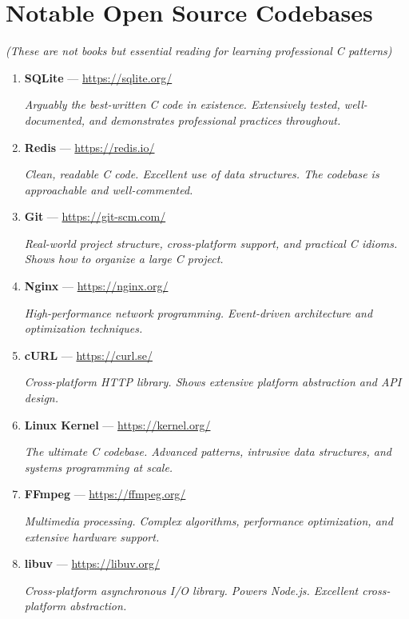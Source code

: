 \documentclass[11pt,openany]{book}
\begin{document}
\section*{Notable Open Source Codebases}

\textit{(These are not books but essential reading for learning professional C patterns)}

\begin{enumerate}
    \item \textbf{SQLite} — \url{https://sqlite.org/}

    \textit{Arguably the best-written C code in existence. Extensively tested, well-documented, and demonstrates professional practices throughout.}

    \item \textbf{Redis} — \url{https://redis.io/}

    \textit{Clean, readable C code. Excellent use of data structures. The codebase is approachable and well-commented.}

    \item \textbf{Git} — \url{https://git-scm.com/}

    \textit{Real-world project structure, cross-platform support, and practical C idioms. Shows how to organize a large C project.}

    \item \textbf{Nginx} — \url{https://nginx.org/}

    \textit{High-performance network programming. Event-driven architecture and optimization techniques.}

    \item \textbf{cURL} — \url{https://curl.se/}

    \textit{Cross-platform HTTP library. Shows extensive platform abstraction and API design.}

    \item \textbf{Linux Kernel} — \url{https://kernel.org/}

    \textit{The ultimate C codebase. Advanced patterns, intrusive data structures, and systems programming at scale.}

    \item \textbf{FFmpeg} — \url{https://ffmpeg.org/}

    \textit{Multimedia processing. Complex algorithms, performance optimization, and extensive hardware support.}

    \item \textbf{libuv} — \url{https://libuv.org/}

    \textit{Cross-platform asynchronous I/O library. Powers Node.js. Excellent cross-platform abstraction.}
\end{enumerate}
\end{document}
